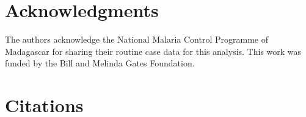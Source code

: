 \documentclass[review]{elsarticle}
\begin{document}
\section*{Acknowledgments}
The authors acknowledge the National Malaria Control Programme of Madagascar for sharing their routine case data for this analysis.
This work was funded by the Bill and Melinda Gates Foundation.


\section*{Citations}
 
%
%
\end{document}
